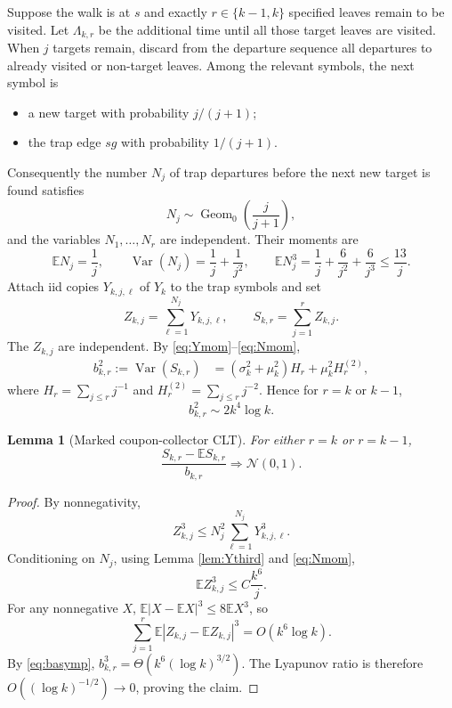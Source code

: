 \documentclass[11pt]{article}
\newtheorem{lemma}[theorem]{Lemma}
\newcommand{\E}{\mathbb E}
\newcommand{\Var}{\operatorname{Var}}
\newcommand{\N}{\mathcal N}
\begin{document}
Suppose the walk is at $s$ and exactly $r\in\{k-1,k\}$ specified leaves
remain to be visited.  Let $\Lambda_{k,r}$ be the additional time until all
those target leaves are visited.  When $j$ targets remain, discard from the
departure sequence all departures to already visited or non-target leaves.
Among the relevant symbols, the next symbol is
\begin{itemize}
\item a new target with probability $j/(j+1)$;
\item the trap edge $s g$ with probability $1/(j+1)$.
\end{itemize}
Consequently the number $N_j$ of trap departures before the next new target is
found satisfies
\[
 N_j\sim\operatorname{Geom}_0\!\left(\frac{j}{j+1}\right),
\]
and the variables $N_1,\dots,N_r$ are independent.  Their moments are
\begin{equation}\label{eq:Nmom}
 \E N_j=\frac1j,
 \qquad
 \Var(N_j)=\frac1j+\frac1{j^2},
 \qquad
 \E N_j^3=\frac1j+\frac6{j^2}+\frac6{j^3}\le\frac{13}{j}.
\end{equation}
Attach iid copies $Y_{k,j,\ell}$ of $Y_k$ to the trap symbols and set
\[
 Z_{k,j}=\sum_{\ell=1}^{N_j}Y_{k,j,\ell},
 \qquad
 S_{k,r}=\sum_{j=1}^r Z_{k,j}.
\]
The $Z_{k,j}$ are independent.  By \eqref{eq:Ymom}--\eqref{eq:Nmom},
\begin{align}
 b_{k,r}^2:=\Var(S_{k,r})
 &=(\sigma_k^2+\mu_k^2)H_r+\mu_k^2H_r^{(2)},\label{eq:bexact}
\end{align}
where $H_r=\sum_{j\le r}j^{-1}$ and
$H_r^{(2)}=\sum_{j\le r}j^{-2}$.  Hence for $r=k$ or $k-1$,
\begin{equation}\label{eq:basymp}
 b_{k,r}^2\sim 2k^4\log k.
\end{equation}

\begin{lemma}[Marked coupon-collector CLT]\label{lem:markedclt}
For either $r=k$ or $r=k-1$,
\[
 \frac{S_{k,r}-\E S_{k,r}}{b_{k,r}}
 \Longrightarrow \N(0,1).
\]
\end{lemma}

\begin{proof}
By nonnegativity,
\[
 Z_{k,j}^3
 \le N_j^2\sum_{\ell=1}^{N_j}Y_{k,j,\ell}^3.
\]
Conditioning on $N_j$, using Lemma \ref{lem:Ythird} and \eqref{eq:Nmom},
\[
 \E Z_{k,j}^3\le C\frac{k^6}{j}.
\]
For any nonnegative $X$,
$\E|X-\E X|^3\le8\E X^3$, so
\[
 \sum_{j=1}^r \E|Z_{k,j}-\E Z_{k,j}|^3
 =O(k^6\log k).
\]
By \eqref{eq:basymp}, $b_{k,r}^3=\Theta(k^6(\log k)^{3/2})$.
The Lyapunov ratio is therefore $O((\log k)^{-1/2})\to0$, proving the claim.
\end{proof}
\end{document}
